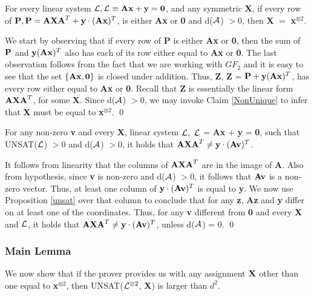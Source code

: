 {	
\begin{claim} \label{claim:Punique}
For every linear system ${\cal L}, {\cal L} \equiv {\bf Ax} + {\bf y} = {\bf 0}$, and any symmetric {\bf X},
if every row of ${\bf P}, {\bf P} = {\bf AXA}^T + {\bf y}  
\cdot ({\bf Ax})^T$, is either {\bf Ax} or {\bf 0} and d(${\cal A}$)  $> 0$, 
then {\bf X} $=$ {\bf x}$^{\otimes 2}$. 
\end{claim}
  We start by observing that if every row of
{\bf P} is either {\bf Ax} or {\bf 0}, then the sum of ${\bf P}$ and
${\bf y}({\bf Ax})^T$ also has each of its row either equal to {\bf
  Ax} or {\bf 0}.  The last observation follows from the fact that we
are working with ${GF}_2$ and it is easy to see that the set
$\{{\bf Ax}, {\bf 0}\}$ is closed under addition. Thus, {\bf Z}, {\bf
  Z} = ${\bf P} + {\bf y}({\bf Ax})^T$, has every row either equal to
{\bf Ax} or {\bf 0}.  Recall that {\bf Z} is essentially the linear
form ${\bf AXA}^T$, for some {\bf X}. Since d(${\cal A}$) $> 0$,  we may invoke
 Claim \ref{NonUnique} to infer that {\bf X} must be equal to {\bf x}$^{\otimes 2}$.  \qed

\begin{proposition}\label{Non-equality}
For any non-zero {\bf v} and every {\bf X}, linear 
system ${\cal L}, \ {\cal L}$ = {\bf Ax} $+$ {\bf y} = {\bf 0}, such 
that UNSAT(${\cal L}$) $> 0$ and d(${\cal A}$) $ > 0$, 
it holds that  ${\bf AXA}^T  \ne {\bf y} \cdot ({\bf Av})^T$.
\end{proposition}
  It follows from linearity that the 
columns of ${\bf AXA}^T$ are in the image of
{\bf A}. Also from hypothesis, since {\bf v} is non-zero and d(${\cal A}$) $> 0$, 
it follows that ${\bf Av}$ is 
a non-zero vector. Thus, at least one column of ${\bf y} \cdot ({\bf Av})^T$ is 
equal to {\bf y}. We now use Proposition \ref{unsat} over that column to conclude that for any {\bf z}, {\bf Az} and {\bf y} differ
on at least one of the coordinates. Thus, for any {\bf v} different from {\bf 0} and every {\bf X} and ${\cal L}$,  
it holds that ${\bf AXA}^T  \ne {\bf y} \cdot ({\bf Av})^T$, unless d(${\cal A}$) = 0.  \qed


\subsubsection{Main Lemma}

\noindent We now show that if the prover provides us with any
assignment ${\bf X}$ other than one equal to {\bf x}$^{\otimes 2}$, then
UNSAT(${\cal L}^{\otimes 2}$, {\bf X}) is larger than $d^2$. 

}
